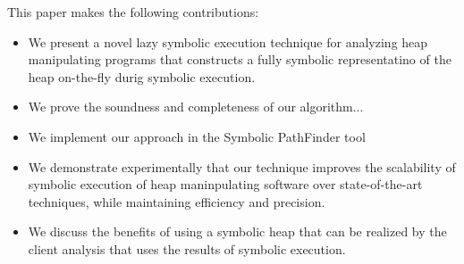 \begin{comment}

The key advantages of our approach to lazy symbolic execution
using a fully symbolic heap include:
\begin{itemize}
\item{\emph{Scalability.} Our approach constructs the symbolic
heap on-the-fly during symbolic execution and avoids creating
the additional points of non-determinism
introduced by existing lazy initialization techniques. Moreover, it explores
each execution path only once for any given set of isomorphic heaps.}
\item{\emph{Precision.} At any given point during symbolic execution, 
the symbolic heap represents the exact set of feasible
concrete heap structures for the program under analysis}
\item{\emph{Expressiveness.} The symbolic heap can represent recursive 
data structures  and heap structures resulting from loops and recursive control 
structures in the analyzed code. }
 \end{itemize}
\end{comment}

This paper makes the following contributions:

\begin{itemize}
\item{We present a novel lazy symbolic execution technique
 for analyzing heap manipulating
programs that constructs a fully symbolic representatino of
the heap on-the-fly durig symbolic execution.}
\item{We prove the soundness and completeness of our algorithm...}
\item{We implement our approach in the Symbolic PathFinder tool}
\item{We demonstrate experimentally that our technique improves
the scalability of symbolic execution of heap maninpulating software
over state-of-the-art techniques, while maintaining efficiency and precision.}
  \item{We discuss the benefits of using a symbolic heap that
  can be realized by the client analysis that uses the results of symbolic execution.}
 \end{itemize}

